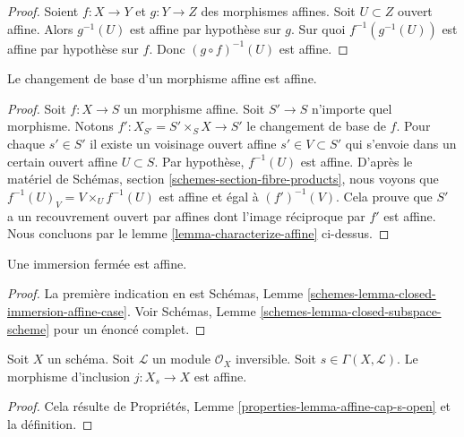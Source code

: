 \begin{proof}
Soient $f : X \to Y$ et $g : Y \to Z$ des morphismes affines.
Soit $U \subset Z$ ouvert affine. Alors $g^{-1}(U)$ est affine
par hypothèse sur $g$. Sur quoi $f^{-1}(g^{-1}(U))$ est affine
par hypothèse sur $f$. Donc $(g \circ f)^{-1}(U)$ est affine.
\end{proof}

\begin{lemma}
\label{lemma-base-change-affine}
Le changement de base d'un morphisme affine est affine.
\end{lemma}

\begin{proof}
Soit $f : X \to S$ un morphisme affine. Soit $S' \to S$ n'importe quel
morphisme. Notons $f' : X_{S'} = S' \times_S X \to S'$ le changement de base de $f$.
Pour chaque $s' \in S'$ il existe un voisinage ouvert affine
$s' \in V \subset S'$ qui s'envoie dans un certain ouvert affine $U \subset S$.
Par hypothèse, $f^{-1}(U)$ est affine. D'après le
matériel de Schémas, section \ref{schemes-section-fibre-products}, nous voyons que
$f^{-1}(U)_V = V \times_U f^{-1}(U)$ est affine et égal à $(f')^{-1}(V)$. Cela prouve
que $S'$ a un recouvrement ouvert par affines dont
l'image réciproque par $f'$ est affine. Nous concluons
par le lemme \ref{lemma-characterize-affine} ci-dessus.
\end{proof}

\begin{lemma}
\label{lemma-closed-immersion-affine}
Une immersion fermée est affine.
\end{lemma}

\begin{proof}
La première indication
en est Schémas, Lemme \ref{schemes-lemma-closed-immersion-affine-case}. Voir Schémas,
Lemme \ref{schemes-lemma-closed-subspace-scheme} pour un énoncé
complet.
\end{proof}

\begin{lemma}
\label{lemma-affine-s-open}
Soit $X$ un
schéma. Soit $\mathcal{L}$ un module $\mathcal{O}_X$ inversible.
Soit $s \in \Gamma(X, \mathcal{L})$. Le morphisme
d'inclusion $j : X_s \to X$ est affine.
\end{lemma}

\begin{proof}
Cela résulte de Propriétés, Lemme \ref{properties-lemma-affine-cap-s-open} et la
définition.
\end{proof}

